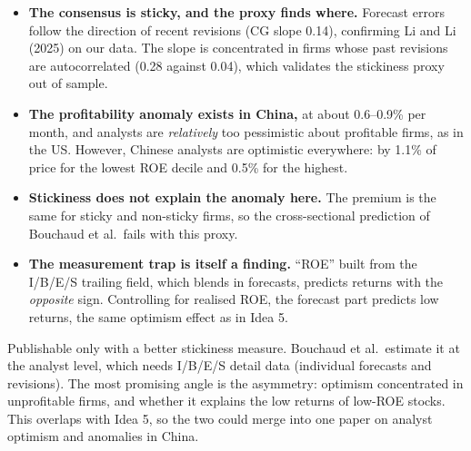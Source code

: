 \begin{itemize}
\item \textbf{The consensus is sticky, and the proxy finds where.} Forecast errors follow the direction of recent
  revisions (CG slope 0.14), confirming Li and Li (2025) on our data. The slope is concentrated in firms whose past
  revisions are autocorrelated (0.28 against 0.04), which validates the stickiness proxy out of sample.
\item \textbf{The profitability anomaly exists in China,} at about 0.6--0.9\% per month, and analysts are
  \emph{relatively} too pessimistic about profitable firms, as in the US. However, Chinese analysts are optimistic
  everywhere: by 1.1\% of price for the lowest ROE decile and 0.5\% for the highest.
\item \textbf{Stickiness does not explain the anomaly here.} The premium is the same for sticky and non-sticky
  firms, so the cross-sectional prediction of Bouchaud et al.\ fails with this proxy.
\item \textbf{The measurement trap is itself a finding.} ``ROE'' built from the I/B/E/S trailing field, which blends
  in forecasts, predicts returns with the \emph{opposite} sign. Controlling for realised ROE, the forecast part
  predicts low returns, the same optimism effect as in Idea 5.
\end{itemize}

Publishable only with a better stickiness measure. Bouchaud et al.\ estimate it at the analyst level, which needs
I/B/E/S detail data (individual forecasts and revisions). The most promising angle is the asymmetry: optimism
concentrated in unprofitable firms, and whether it explains the low returns of low-ROE stocks. This overlaps with
Idea 5, so the two could merge into one paper on analyst optimism and anomalies in China.

